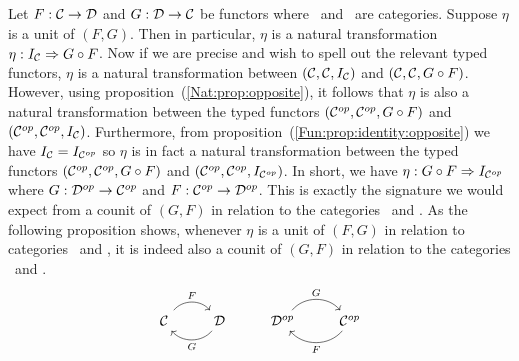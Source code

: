 Let $F:\mbox{$\cal C$}\to\mbox{$\cal D$}$ and $G:\mbox{$\cal D$}\to\mbox{$\cal C$}$ be functors where \Cat\ and \Dat\ 
are categories. Suppose $\eta$ is a unit of $(F,G)$. Then in particular,
$\eta$ is a natural transformation $\eta:I_{\cal C}\Rightarrow G\circ F$.
Now if we are precise and wish to spell out the relevant typed functors,
$\eta$ is a natural transformation between $(\mbox{$\cal C$},\mbox{$\cal C$},I_{\cal C})$ and
$(\mbox{$\cal C$},\mbox{$\cal C$},G\circ F)$. However, using proposition~(\ref{Nat:prop:opposite}),
it follows that $\eta$ is also a natural transformation between the typed
functors $(\mbox{${\cal C}^{op}$},\mbox{${\cal C}^{op}$},G\circ F)$ and $(\mbox{${\cal C}^{op}$},\mbox{${\cal C}^{op}$},I_{\cal C})$. Furthermore,
from proposition~(\ref{Fun:prop:identity:opposite}) we have $I_{\cal C}=
I_{{\cal C}^{op}}$ so $\eta$ is in fact a natural transformation between
the typed functors $(\mbox{${\cal C}^{op}$},\mbox{${\cal C}^{op}$},G\circ F)$ and $(\mbox{${\cal C}^{op}$},\mbox{${\cal C}^{op}$},I_{{\cal C}^{op}})$.
In short, we have $\eta:G\circ F\Rightarrow I_{{\cal C}^{op}}$ where 
$G:\mbox{${\cal D}^{op}$}\to\mbox{${\cal C}^{op}$}$ and $F:\mbox{${\cal C}^{op}$}\to\mbox{${\cal D}^{op}$}$. This is exactly the signature we would 
expect from a counit of $(G,F)$ in relation to the categories \Dop\ and \Cop. 
As the following proposition shows, whenever $\eta$ is a unit of $(F,G)$ in
relation to categories \Cat\ and \Dat, it is indeed also a counit of $(G,F)$ in 
relation to the categories \Dop\ and \Cop.
    \[
        \begin{tikzcd}
              \Cat \arrow[r, "F", bend left  = 50, ""{name=U, below}]
            & \Dat \arrow[l, "G", bend left = 50, ""{name=D, above}]
            & \Dop \arrow[r, "G", bend left  = 50, ""{name=U, below}]
            & \Cop \arrow[l, "F", bend left  = 50, ""{name=U, below}]
        \end{tikzcd}
    \]
\
